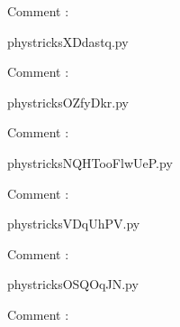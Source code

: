     Comment : 

    \clearpage
    


    \newcommand{\CaptionFigXDdastq}{<+Type your caption here+>}
    \begin{center}
        
    \end{center}
    phystricksXDdastq.py

    Comment : 

    \clearpage
    


    \newcommand{\CaptionFigOZfyDkr}{<+Type your caption here+>}
    \begin{center}
        
    \end{center}
    phystricksOZfyDkr.py

    Comment : 

    \clearpage
    


    \newcommand{\CaptionFigNQHTooFlwUeP}{<+Type your caption here+>}
    \begin{center}
        
    \end{center}
    phystricksNQHTooFlwUeP.py

    Comment : 

    \clearpage
    


    \newcommand{\CaptionFigVDqUhPV}{<+Type your caption here+>}
    \begin{center}
        
    \end{center}
    phystricksVDqUhPV.py

    Comment : 

    \clearpage
    


    \newcommand{\CaptionFigOSQOqJN}{<+Type your caption here+>}
    \begin{center}
        
    \end{center}
    phystricksOSQOqJN.py

    Comment : 

    \clearpage
    



